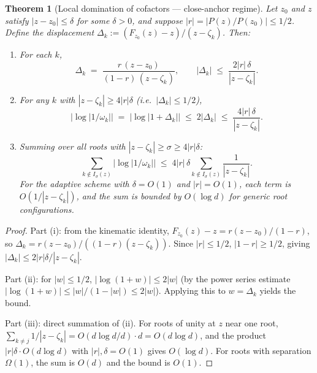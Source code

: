 \documentclass[10pt,a4paper,oneside]{book}
\newtheorem{theorem}{Theorem}[chapter]
\theoremstyle{definition}
\theoremstyle{remark}
\begin{document}
\begin{theorem}[Local domination of cofactors --- close-anchor regime]
\label{lem:cluster_domination}
Let $z_0$ and $z$ satisfy $|z - z_0| \leq \delta$ for some $\delta > 0$, and suppose $|r| = |P(z)/P(z_0)| \leq 1/2$.  Define the displacement $\Delta_k := (F_{z_0}(z) - z)/(z - \zeta_k)$.  Then:
\begin{enumerate}
  \item[\textup{(i)}] For each $k$,
  \begin{equation}
    \label{eq:Delta_k}
    \Delta_k \;=\; \frac{r\,(z-z_0)}{(1-r)\,(z - \zeta_k)},
    \qquad
    |\Delta_k| \;\leq\; \frac{2|r|\,\delta}{|z - \zeta_k|}.
  \end{equation}
  \item[\textup{(ii)}] For any $k$ with $|z - \zeta_k| \geq 4|r|\delta$ (i.e.\ $|\Delta_k| \leq 1/2$),
  \begin{equation}
    \label{eq:far_log_bound}
    \bigl|\log|1/\omega_k|\bigr| \;=\; \bigl|\log|1 + \Delta_k|\bigr|
    \;\leq\; 2|\Delta_k|
    \;\leq\; \frac{4|r|\,\delta}{|z - \zeta_k|}.
  \end{equation}
  \item[\textup{(iii)}] Summing over all roots with $|z - \zeta_k| \geq \sigma \geq 4|r|\delta$:
  \begin{equation}
    \label{eq:far_contribution}
    \sum_{k \notin I_\sigma(z)} \bigl|\log|1/\omega_k|\bigr|
    \;\leq\;
    4|r|\,\delta \sum_{k \notin I_\sigma(z)} \frac{1}{|z-\zeta_k|}.
  \end{equation}
  For the adaptive scheme with $\delta = O(1)$ and $|r| = O(1)$, each term is $O(1/|z-\zeta_k|)$, and the sum is bounded by $O(\log d)$ for generic root configurations.
\end{enumerate}
\end{theorem}

\begin{proof}
Part (i): from the kinematic identity, $F_{z_0}(z) - z = r(z-z_0)/(1-r)$, so $\Delta_k = r(z-z_0)/((1-r)(z-\zeta_k))$.  Since $|r| \leq 1/2$, $|1-r| \geq 1/2$, giving $|\Delta_k| \leq 2|r|\delta/|z-\zeta_k|$.

Part (ii): for $|w| \leq 1/2$, $|\log(1+w)| \leq 2|w|$ (by the power series estimate $|\log(1+w)| \leq |w|/(1-|w|) \leq 2|w|$).  Applying this to $w = \Delta_k$ yields the bound.

Part (iii): direct summation of (ii).  For roots of unity at $z$ near one root, $\sum_{k \neq j} 1/|z-\zeta_k| = O(d\log d/d) \cdot d = O(d\log d)$, and the product $|r|\delta \cdot O(d\log d)$ with $|r|,\delta = O(1)$ gives $O(\log d)$.  For roots with separation $\Omega(1)$, the sum is $O(d)$ and the bound is $O(1)$.
\end{proof}
\end{document}
